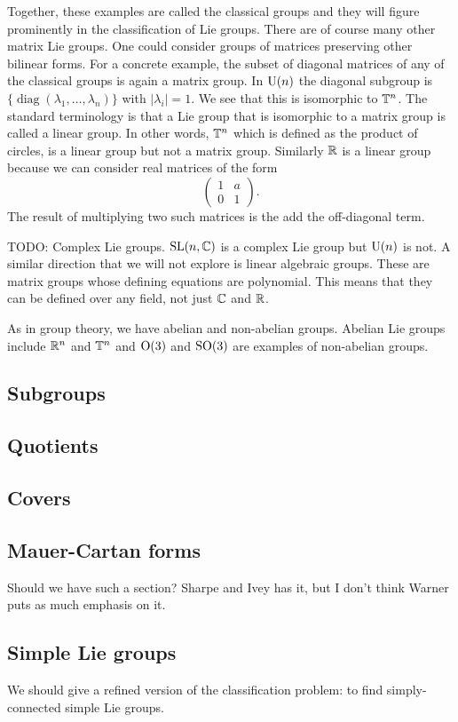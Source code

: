 Together, these examples are called the classical groups and they will figure prominently in the classification of Lie groups.
There are of course many other matrix Lie groups.
One could consider groups of matrices preserving other bilinear forms. 
For a concrete example, the subset of diagonal matrices of any of the classical groups is again a matrix group.
In $\mathrm{U}(n)$ the diagonal subgroup is $\{\operatorname{diag}(\lambda_1,\dots,\lambda_n)\}$ with $|\lambda_i| = 1$.
We see that this is isomorphic to $\mathbb{T}^n$.
The standard terminology is that a Lie group that is isomorphic to a matrix group is called a linear group.
In other words, $\mathbb{T}^n$ which is defined as the product of circles, is a linear group but not a matrix group.
Similarly $\mathbb{R}$ is a linear group because we can consider real matrices of the form
\[
\begin{pmatrix}
1 & a \\
0 & 1
\end{pmatrix}.
\]
The result of multiplying two such matrices is the add the off-diagonal term.

TODO: Complex Lie groups. $\mathrm{SL}(n,\mathbb{C})$ is a complex Lie group but $\mathrm{U}(n)$ is not.
A similar direction that we will not explore is linear algebraic groups.
These are matrix groups whose defining equations are polynomial.
This means that they can be defined over any field, not just $\mathbb{C}$ and $\mathbb{R}$.


As in group theory, we have abelian and non-abelian groups.
Abelian Lie groups include $\mathbb{R}^n$ and $\mathbb{T}^n$ and $\mathrm{O}(3)$ and $\mathrm{SO}(3)$ are examples of non-abelian groups.


\subsection{Subgroups}


\subsection{Quotients}


\subsection{Covers}


\subsection{Mauer-Cartan forms}
Should we have such a section? Sharpe and Ivey has it, but I don't think Warner puts as much emphasis on it.


\subsection{Simple Lie groups}
We should give a refined version of the classification problem: to find simply-connected simple Lie groups.
